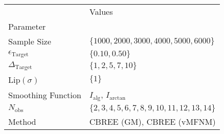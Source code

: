 \begin{tabular}{ll}
 & Values \\
Parameter &  \\
Sample Size & $\{ 1000, 2000, 3000, 4000, 5000, 6000 \}$ \\
\cline{1-2}
$\epsilon_{{\text{{Target}}}}$ & $\{ 0.10, 0.50 \}$ \\
\cline{1-2}
$\Delta_{{\text{{Target}}}}$ & $\{ 1, 2, 5, 7, 10 \}$ \\
\cline{1-2}
Lip$(\sigma)$ & $\{ 1 \}$ \\
\cline{1-2}
Smoothing Function & $I_\text{alg}$, $I_\text{arctan}$ \\
\cline{1-2}
$N_{{ \text{{obs}} }}$ & $\{ 2, 3, 4, 5, 6, 7, 8, 9, 10, 11, 12, 13, 14 \}$ \\
\cline{1-2}
Method & CBREE (GM), CBREE (vMFNM) \\
\cline{1-2}
\end{tabular}
